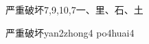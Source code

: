 \begin{entry}{严重破坏}{7,9,10,7}{⼀、⾥、⽯、⼟}
  \begin{phonetics}{严重破坏}{yan2zhong4 po4huai4}
  \end{phonetics}
\end{entry}
